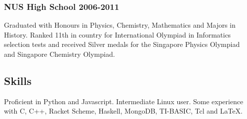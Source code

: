 \documentclass[letterpaper]{article}
\begin{document}
\subsubsection*{NUS High School \hfill 2006-2011}
Graduated with Honours in Physics, Chemistry, Mathematics and Majors in History. Ranked 11th in country for International Olympiad in Informatics selection tests and received Silver medals for the Singapore Physics Olympiad and Singapore Chemistry Olympiad.

\vspace{1em}

\begin{center}
\section*{Skills}
\end{center}
Proficient in Python and Javascript. Intermediate Linux user. Some experience with C, C++, Racket Scheme, Haskell, MongoDB, TI-BASIC, Tcl and LaTeX.
\end{document}
